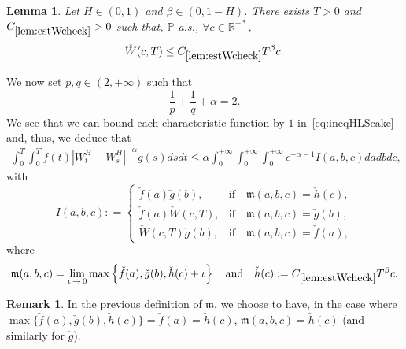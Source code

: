 \documentclass[10pt]{amsart}
\newtheorem{lemm}[theo]{Lemma}\newtheorem{prop}[theo]{Proposition}\newtheorem{coro}[theo]{Corollary}\newtheorem{conj}[theo]{Conjecture}
\theoremstyle{definition}\newtheorem{defi}[theo]{Definition}\newtheorem{rema}[theo]{Remark}\newtheorem{exam}[theo]{Example}\newtheorem{exem}[theo]{Example}\newtheorem{nota}[theo]{Notation}
\newcommand{\bbP}{\mathbb{P}}
\newcommand{\bbR}{\mathbb{R}}
\newcommand{\frkm}{\mathfrak{m}}
\let\oldforall\forall
\renewcommand*{\forall}{\mathrel{\oldforall}}
\begin{document}
\begin{lemm}\label{lem:estWcheck}
Let $H\in(0,1)$ and $\beta\in (0,1-H)$. There exists $T>0$ and $C_{\ref{lem:estWcheck}}>0$ such that, $\bbP$-a.s., $\forall c\in\bbR^{+*}$,
\[
\check{W}(c,T) \leq C_{\ref{lem:estWcheck}} T^{\beta} c.
\]
\end{lemm}

We now set $p,q\in (2,+\infty)$ such that
\[
\frac 1 p + \frac 1 q + \alpha = 2.
\]
We see that we can bound each characteristic function by $1$ in~\eqref{eq:ineqHLScake} and, thus, we deduce that
\begin{align*}
\int_0^T\int_0^T f(t)\left|W_t^H-W_s^H\right|^{-\alpha}g(s) ds dt \leq \alpha\int_0^{+\infty}\int_0^{+\infty}\int_0^{+\infty} c^{-\alpha-1}I(a,b,c) da db dc,
\end{align*}
with
\[
I(a,b,c) : =
\begin{cases}
\check{f}(a)\check{g}(b), &\text{if}\quad \frkm(a,b,c) = \check{h}(c),
\\ \check{f}(a)\check{W}(c,T), &\text{if}\quad \frkm(a,b,c) = \check{g}(b),
\\ \check{W}(c,T)\check{g}(b), &\text{if}\quad \frkm(a,b,c) = \check{f}(a),
\end{cases}
\]
where
\[
\frkm(a,b,c) = \lim_{\iota\,\to\,0} \max\left\{ \check{f}(a),\check{g}(b),\check{h}(c)+\iota\right\}\quad\text{and}\quad\check{h}(c) : = C_{\ref{lem:estWcheck}} T^{\beta} c.
\]

\begin{rema}
In the previous definition of $\frkm$, we choose to have, in the case where $\max\{ \check{f}(a),\check{g}(b),\check{h}(c)\} = \check{f}(a) = \check{h}(c)$, $\frkm(a,b,c) = \check{h}(c)$ (and similarly for $\check{g}$).
\end{rema}
\end{document}
